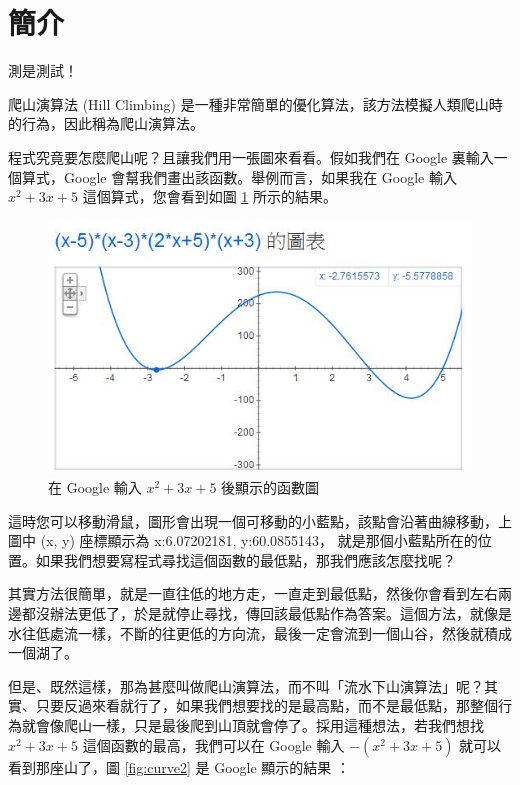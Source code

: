 \section{簡介}

測是測試！

爬山演算法 (Hill Climbing) 是一種非常簡單的優化算法，該方法模擬人類爬山時的行為，因此稱為爬山演算法。

程式究竟要怎麼爬山呢？且讓我們用一張圖來看看。假如我們在 Google 裏輸入一個算式，Google 會幫我們畫出該函數。舉例而言，如果我在 Google 輸入 $x^2+3x+5$  這個算式，您會看到如圖 \ref{fig:curve1} 所示的結果。

\begin{figure}
  \includegraphics[width=\linewidth]{img/GoogleGraph2Dvally.jpg}
  \caption{在 Google 輸入 $x^2+3x+5$ 後顯示的函數圖}
  \label{fig:curve1}
\end{figure}


這時您可以移動滑鼠，圖形會出現一個可移動的小藍點，該點會沿著曲線移動，上圖中 (x, y) 座標顯示為 x:6.07202181, y:60.0855143，
就是那個小藍點所在的位置。如果我們想要寫程式尋找這個函數的最低點，那我們應該怎麼找呢？

其實方法很簡單，就是一直往低的地方走，一直走到最低點，然後你會看到左右兩邊都沒辦法更低了，於是就停止尋找，傳回該最低點作為答案。這個方法，就像是水往低處流一樣，不斷的往更低的方向流，最後一定會流到一個山谷，然後就積成一個湖了。

但是、既然這樣，那為甚麼叫做爬山演算法，而不叫「流水下山演算法」呢？其 實、只要反過來看就行了，如果我們想要找的是最高點，而不是最低點，那整個行為就會像爬山一樣，只是最後爬到山頂就會停了。採用這種想法，若我們想找 $x^2+3x+5$ 這個函數的最高，我們可以在 Google 輸入  $-(x^2+3x+5)$  就可以看到那座山了，圖  \ref{fig:curve2} 是 Google 顯示的結果  ：

